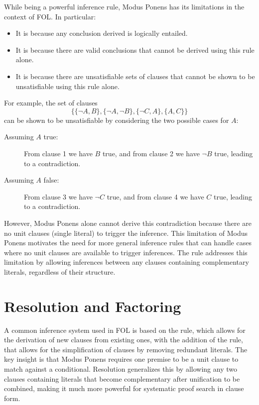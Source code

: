 While being a powerful inference rule, Modus Ponens has its limitations in the context of FOL\@.
In particular:
\begin{itemize}
  \item It is  because any conclusion derived is logically entailed.
  \item It is  because there are valid conclusions that cannot be derived using this rule alone.
  \item It is  because there are unsatisfiable sets of clauses that cannot be shown to be unsatisfiable using this rule alone.
\end{itemize}
For example, the set of clauses
\begin{equation}\label{eq:example_unsat}  
  \{\{\neg A, B\},\{\neg A , \neg B\}, \{\neg C , A\}, \{A , C\}\}
\end{equation}
can be shown to be unsatisfiable by considering the two possible cases for \(A\):
\begin{description}
  \item[Assuming \(A\) true:] From clause 1 we have \(B\) true, and from clause 2 we have \(\neg B\) true, leading to a contradiction.
  \item[Assuming \(A\) false:] From clause 3 we have \(\neg C\) true, and from clause 4 we have \(C\) true, leading to a contradiction.
\end{description}
However, Modus Ponens alone cannot derive this contradiction because there are no unit clauses (single literal) to trigger the inference.
This limitation of Modus Ponens motivates the need for more general inference rules that can handle cases where no unit clauses are available to trigger inferences.
The  rule addresses this limitation by allowing inferences between any clauses containing complementary literals, regardless of their structure.

\section{Resolution and Factoring}\label{sec:resolution-factoring}

A common inference system used in FOL is based on the  rule, which allows for the derivation of new clauses from existing ones, with the addition of the  rule, that allows for the simplification of clauses by removing redundant literals.
The key insight is that Modus Ponens requires one premise to be a unit clause to match against a conditional.
Resolution generalizes this by allowing any two clauses containing literals that become complementary after unification to be combined, making it much more powerful for systematic proof search in clause form.

